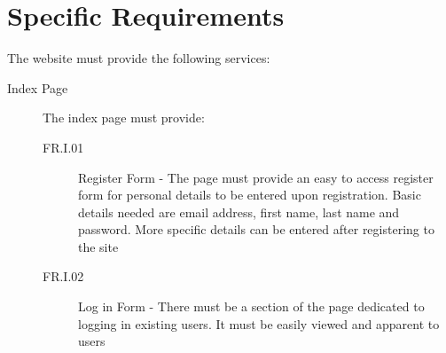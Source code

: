 \documentclass[11pt]{article}
\begin{document}
\section{Specific Requirements}
The website must provide the following services:
\begin{description}

\item[Index Page] The index page must provide:
\begin{description}
\item[FR.I.01] Register Form - The page must provide an easy to access register form for personal details to be entered upon registration. Basic details needed are email address, first name, last name and password. More specific details can be entered after registering to the site
\item[FR.I.02] Log in Form - There must be a section of the page dedicated to logging in existing users. It must be easily viewed and apparent to users
\end{description}


\end{description}
\end{document}
